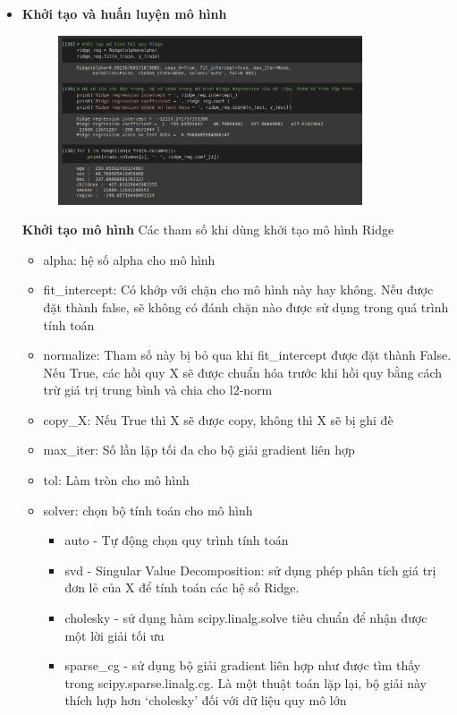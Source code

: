 \documentclass{article}
\begin{document}
\begin{itemize}
		\item \textbf{Khởi tạo và huấn luyện mô hình}
		\begin{figure}[H]
			\centering
			\includegraphics[width=0.85\textwidth]{images/ridge_reg/ridge_reg_init_training.png}
		\end{figure}
		\textbf{Khởi tạo mô hình} Các tham số khi dùng khởi tạo mô hình Ridge
		\begin{itemize}
			\item alpha: hệ số alpha cho mô hình
			\item fit\_intercept: Có khớp với chặn cho mô hình này hay không. Nếu được đặt thành false, sẽ không có đánh chặn nào được sử dụng trong quá trình tính toán
			\item normalize: Tham số này bị bỏ qua khi fit\_intercept được đặt thành False. Nếu True, các hồi quy X sẽ được chuẩn hóa trước khi hồi quy bằng cách trừ giá trị trung bình và chia cho l2-norm
			\item copy\_X: Nếu True thì X sẽ được copy, không thì X sẽ bị ghi đè
			\item max\_iter: Số lần lặp tối đa cho bộ giải gradient liên hợp
			\item tol: Làm tròn cho mô hình
			\item solver: chọn bộ tính toán cho mô hình
			\begin{itemize}
				\item auto - Tự động chọn quy trình tính toán
				\item svd - Singular Value Decomposition: sử dụng phép phân tích giá trị đơn lẻ của X để tính toán các hệ số Ridge.
				\item cholesky - sử dụng hàm scipy.linalg.solve tiêu chuẩn để nhận được một lời giải tối ưu
				\item sparse\_cg - sử dụng bộ giải gradient liên hợp như được tìm thấy trong scipy.sparse.linalg.cg. Là một thuật toán lặp lại, bộ giải này thích hợp hơn ‘cholesky’ đối với dữ liệu quy mô lớn

\end{itemize}
\end{itemize}
\end{itemize}
\end{document}
